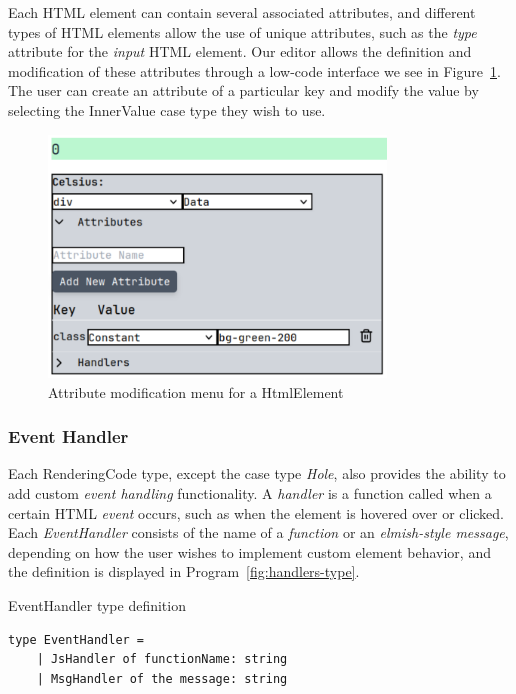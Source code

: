 Each HTML element can contain several associated attributes, and different types of HTML elements allow the use of unique attributes, such as the \emph{type} attribute for the \emph{input} HTML element.
Our editor allows the definition and modification of these attributes through a low-code interface we see in Figure~\ref{fig:attrs-menu}.
The user can create an attribute of a particular key and modify the value by selecting the InnerValue case type they wish to use.

\begin{figure}[htbp]
	\begin{center}
		\includegraphics[width=0.8\textwidth]{img/attribute-menu.pdf}
	\end{center}
	\caption{Attribute modification menu for a HtmlElement}\label{fig:attrs-menu}
\end{figure}

\subsubsection{Event Handler}
Each RenderingCode type, except the case type \emph{Hole}, also provides the ability to add custom \emph{event handling} functionality.
A \emph{handler} is a function called when a certain HTML \emph{event} occurs, such as when the element is hovered over or clicked.
Each \emph{EventHandler} consists of the name of a \emph{function} or an \emph{elmish-style message}, depending on how the user wishes to implement custom element behavior, and the definition is displayed in Program~\ref{fig:handlers-type}.

\begin{listing}[H]
	\caption{EventHandler type definition}
	\label{fig:handlers-type}
	\begin{lstlisting}
type EventHandler =
    | JsHandler of functionName: string
    | MsgHandler of the message: string
  \end{lstlisting}
\end{listing}

